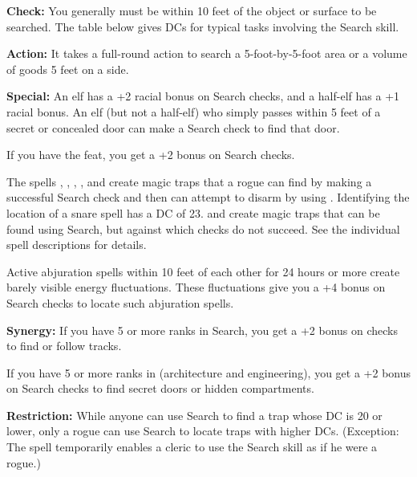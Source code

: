 \textbf{Check:} You generally must be within 10 feet of the object or surface to be searched. The table below gives DCs for typical tasks involving the Search skill.

\textbf{Action:} It takes a full-round action to search a 5-foot-by-5-foot area or a volume of goods 5 feet on a side.

\textbf{Special:} An elf has a +2 racial bonus on Search checks, and a half-elf has a +1 racial bonus. An elf (but not a half-elf) who simply passes within 5 feet of a secret or concealed door can make a Search check to find that door.

If you have the  feat, you get a +2 bonus on Search checks.

The spells , , , , and  create magic traps that a rogue can find by making a successful Search check and then can attempt to disarm by using . Identifying the location of a snare spell has a DC of 23.  and  create magic traps that can be found using Search, but against which  checks do not succeed. See the individual spell descriptions for details.

Active abjuration spells within 10 feet of each other for 24 hours or more create barely visible energy fluctuations. These fluctuations give you a +4 bonus on Search checks to locate such abjuration spells.

\textbf{Synergy:} If you have 5 or more ranks in Search, you get a +2 bonus on  checks to find or follow tracks.

If you have 5 or more ranks in  (architecture and engineering), you get a +2 bonus on Search checks to find secret doors or hidden compartments.

\textbf{Restriction:} While anyone can use Search to find a trap whose DC is 20 or lower, only a rogue can use Search to locate traps with higher DCs. (Exception: The spell  temporarily enables a cleric to use the Search skill as if he were a rogue.)
